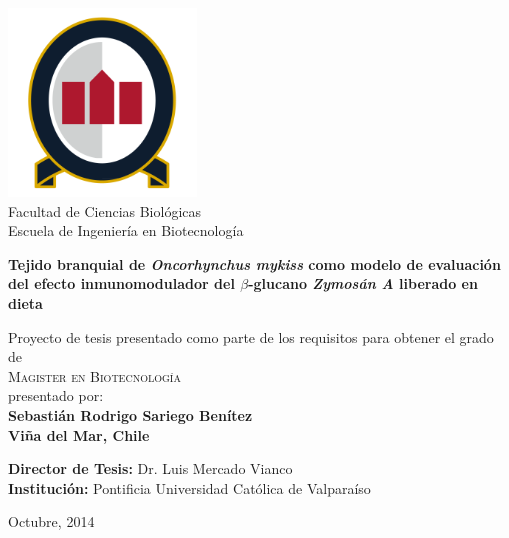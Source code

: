 \documentclass[12pt,letterpaper,oneside]{scrbook}
\date{}
\begin{document}
\begin{titlepage}
    \begin{center}
    
        
\includegraphics[width=5cm]{unab}\\
\vspace{0.1cm}
Facultad de Ciencias Biológicas\\
Escuela de Ingeniería en Biotecnología

        \vspace*{1cm}
        
       \large{ \textbf{Tejido branquial de \emph{Oncorhynchus mykiss} como modelo de evaluación del efecto inmunomodulador del $\beta$-glucano \emph{Zymosán A} liberado en dieta}}
        
        \vspace{0.5cm}
        
        \vspace{1.5cm}
 
        Proyecto de tesis presentado como parte de los requisitos para obtener el grado de \\
        \large{\textsc{Magister en Biotecnología}}\\ 
        
        \vspace{2.5cm}        
        presentado por:\\
        \vspace{0.1cm} 
        \textbf{Sebastián Rodrigo Sariego Benítez}\\
        \textbf{Viña del Mar, Chile}
        
       
             
        
         \vspace{1.5cm}
         
    \textbf{Director de Tesis:} Dr. Luis Mercado Vianco\\
       \textbf{Institución:} Pontificia Universidad Católica de Valparaíso
         
       

        
        
 
        Octubre, 2014
        
 
 
     \end{center}
    \thispagestyle{empty}
\end{titlepage}
\end{document}
